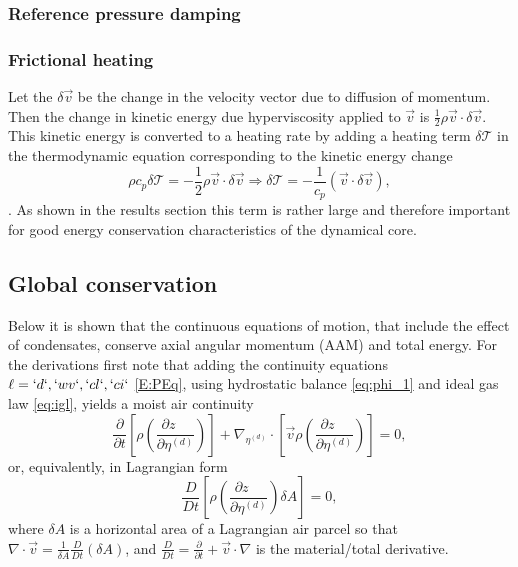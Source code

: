 \documentclass{agujournal}
\begin{document}
\subsubsection{Reference pressure damping}
{\color{red}{Patrick}}
\subsubsection{Frictional heating}
Let the $\delta \vec{v}$ be the change in the velocity vector due to diffusion of momentum. Then the change in kinetic energy due hyperviscosity applied to $\vec{v}$ is $\frac{1}{2}\rho \vec{v} \cdot \delta \vec{v}$. This kinetic energy is converted to a heating rate by adding a heating term $\delta \mathcal{T}$ in the thermodynamic equation corresponding to the kinetic energy change
\begin{equation}
\rho c_p \delta \mathcal{T}=-\frac{1}{2}\rho \vec{v} \cdot \delta \vec{v} \Rightarrow
 \delta \mathcal{T}=-\frac{1}{c_p}\left(\vec{v}\cdot \delta \vec{v}\right),\label{eq:tcp}
\end{equation}
\citep[p.71 in ][]{CAM5}. As shown in the results section this term is rather large and therefore important for good energy conservation characteristics of the dynamical core.
\subsection{Global conservation}
Below it is shown that the continuous equations of motion, that include the effect of condensates, conserve axial angular momentum (AAM) and total energy. For the derivations first note that adding the continuity equations $\ell=`d`,`wv`,`cl`,`ci`$ \eqref{E:PEq}, using hydrostatic balance \eqref{eq:phi_1} and ideal gas law \eqref{eq:igl}, yields a moist air continuity
\begin{equation}
\frac{\partial }{\partial t}\left[ \rho \left(\frac{\partial z\quad}{\partial \eta^{(d)}}\right)\right]+\nabla_{\eta^{(d)}} \cdot \left[ \vec{v}\rho  \left( \frac{\partial z\quad }{\partial \eta^{(d)}}\right)\right]=0,\label{eq:cont2}
\end{equation}
or, equivalently, in Lagrangian form
\begin{equation}
\frac{D}{Dt}\left[ \rho \left( \frac{\partial z\quad }{\partial \eta^{(d)}}\right)\delta A\right]=0,\label{eq:lagra_cont}
\end{equation}
where $\delta A$ is a horizontal area of a Lagrangian air parcel so that $\nabla \cdot \vec{v}=\frac{1}{\delta A}\frac{D}{Dt}\left( \delta A\right)$, and  $\frac{D}{Dt}=\frac{\partial }{\partial t}+\vec{v}\cdot \nabla $ is the material/total derivative. 
\end{document}
